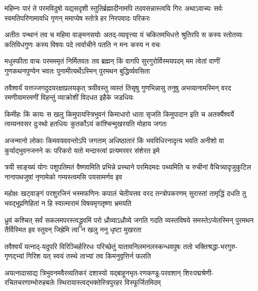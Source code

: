 
\fourlineindentedshloka
{महिम्नः पारं ते परमविदुषो यद्यसदृशी}
{स्तुतिर्ब्रह्मादीनामपि तदवसन्नास्त्वयि गिरः}
{अथाऽवाच्यः सर्वः स्वमतिपरिणामावधि गृणन्}
{ममाप्येष स्तोत्रे हर निरपवादः परिकरः}%

\fourlineindentedshloka
{अतीतः पन्थानं तव च महिमा वाङ्मनसयोः}
{अतद्-व्यावृत्त्या यं चकितमभिधत्ते श्रुतिरपि}
{स कस्य स्तोतव्यः कतिविधगुणः कस्य विषयः}
{पदे त्वर्वाचीने पतति न मनः कस्य न वचः}%

\fourlineindentedshloka
{मधुस्फीता वाचः परमममृतं निर्मितवतः}
{तव ब्रह्मन् किं वागपि सुरगुरोर्विस्मयपदम्}
{मम त्वेतां वाणीं गुणकथनपुण्येन भवतः}
{पुनामीत्यर्थेऽस्मिन् पुरमथन बुद्धिर्व्यवसिता}%

\fourlineindentedshloka
{तवैश्वर्यं यत्तज्जगदुदयरक्षाप्रलयकृत्}
{त्रयीवस्तु व्यस्तं तिसृषु गुणभिन्नासु तनुषु}
{अभव्यानामस्मिन् वरद रमणीयामरमणीं}
{विहन्तुं व्याक्रोशीं विदधत इहैके जडधियः}%

\fourlineindentedshloka
{किमीहः किं कायः स खलु किमुपायस्त्रिभुवनं}
{किमाधारो धाता सृजति किमुपादान इति च}
{अतर्क्यैश्वर्ये त्वय्यनवसर दुःस्थो हतधियः}
{कुतर्कोऽयं कांश्चिन्मुखरयति मोहाय जगतः}%

\fourlineindentedshloka
{अजन्मानो लोकाः किमवयववन्तोऽपि जगताम्}
{अधिष्ठातारं किं भवविधिरनादृत्य भवति}
{अनीशो वा कुर्याद्भुवनजनने कः परिकरो}
{यतो मन्दास्त्वां प्रत्यमरवर संशेरत इमे}%

\fourlineindentedshloka
{त्रयी साङ्ख्यं योगः पशुपतिमतं वैष्णवमिति}
{प्रभिन्ने प्रस्थाने परमिदमदः पथ्यमिति च}
{रुचीनां वैचित्र्यादृजुकुटिल नानापथजुषां}
{नृणामेको गम्यस्त्वमसि पयसामर्णव इव}%

\fourlineindentedshloka
{महोक्षः खट्वाङ्गं परशुरजिनं भस्मफणिनः}
{कपालं चेतीयत्तव वरद तन्त्रोपकरणम्}
{सुरास्तां तामृद्धिं दधति तु भवद्भूप्रणिहितां}
{न हि स्वात्मारामं विषयमृगतृष्णा भ्रमयति}%

\fourlineindentedshloka
{ध्रुवं कश्चित् सर्वं सकलमपरस्त्वद्\mbox{}ध्रुवमिं}
{परो ध्रौव्याऽध्रौव्ये जगति गदति व्यस्तविषये}
{समस्तेऽप्येतस्मिन् पुरमथन तैर्विस्मित इव}
{स्तुवन् जिह्रेमि त्वां न खलु ननु धृष्टा मुखरता}%

\fourlineindentedshloka
{तवैश्वर्यं यत्नाद्-यदुपरि विरिञ्चिर्हरिरधः}
{परिच्छेतुं यातावनिलमनलस्कन्धवपुषः}
{ततो भक्तिश्रद्धा-भरगुरु-गृणद्भ्यां गिरिश यत्}
{स्वयं तस्थे ताभ्यां तव किमनुवृत्तिर्न फलति}%

\fourlineindentedshloka
{अयत्नादासाद्य त्रिभुवनमवैरव्यतिकरं}
{दशास्यो यद्बाहूनभृत-रणकण्डू-परवशान्}
{शिरःपद्मश्रेणी-रचितचरणाम्भोरुहबलेः}
{स्थिरायास्त्वद्भक्तेस्त्रिपुरहर विस्फूर्जितमिदम्}%

